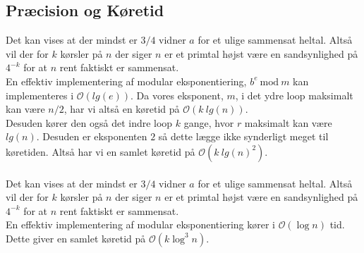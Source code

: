 \documentclass[12pt]{article}
\begin{document}
\subsection*{Præcision og Køretid}
Det kan vises at der mindst er $3/4$ vidner $a$ for et ulige sammensat heltal. Altså vil der for $k$ kørsler på $n$ der siger $n$ er et primtal højst være en sandsynlighed på $4^{-k}$ for at $n$ rent faktiskt er sammensat.\\
En effektiv implementering af modular eksponentiering, $b^e\ \mbox{mod}\ m$ kan implementeres i $\mathcal{O} (lg(e))$. Da vores eksponent, $m$, i det ydre loop maksimalt kan være $n/2$, har vi altså en køretid på $\mathcal{O} (k\ lg(n))$. \\
Desuden kører den også det indre loop $k$ gange, hvor $r$ maksimalt kan være $lg(n)$. Desuden er eksponenten $2$ så dette lægge ikke synderligt meget til køretiden.
Altså har vi en samlet køretid på $\mathcal{O} (k\ lg(n)^2)$.\\
\\
Det kan vises at der mindst er $3/4$ vidner $a$ for et ulige sammensat heltal. Altså vil der for $k$ kørsler på $n$ der siger $n$ er et primtal højst være en sandsynlighed på $4^{-k}$ for at $n$ rent faktiskt er sammensat.\\
En effektiv implementering af modular eksponentiering kører i $\mathcal{O} (\log n)$ tid. \\
Dette giver en samlet køretid på $\mathcal{O} (k\log^3 n)$.


\newpage
\end{document}

